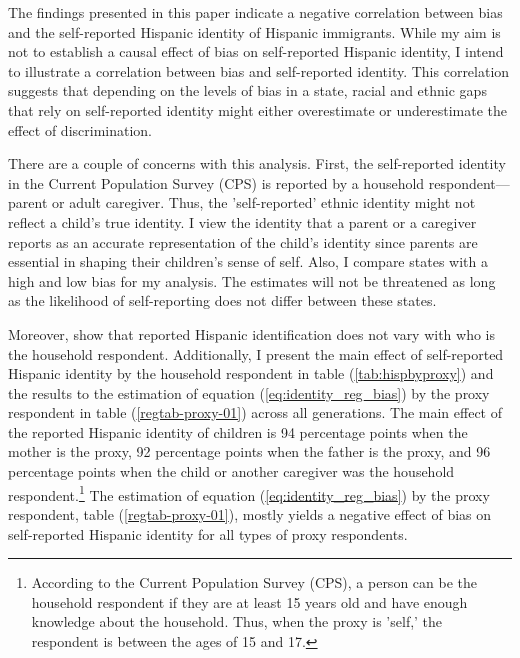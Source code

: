 \documentclass[12pt,english]{article}
\begin{document}
The findings presented in this paper indicate a negative correlation between bias and the self-reported Hispanic identity of Hispanic immigrants. While my aim is not to establish a causal effect of bias on self-reported Hispanic identity, I intend to illustrate a correlation between bias and self-reported identity. This correlation suggests that depending on the levels of bias in a state, racial and ethnic gaps that rely on self-reported identity might either overestimate or underestimate the effect of discrimination.

There are a couple of concerns with this analysis. First, the self-reported identity in the Current Population Survey (CPS) is reported by a household respondent—parent or adult caregiver. Thus, the 'self-reported' ethnic identity might not reflect a child's true identity. I view the identity that a parent or a caregiver reports as an accurate representation of the child's identity since parents are essential in shaping their children's sense of self. Also, I compare states with a high and low bias for my analysis. The estimates will not be threatened as long as the likelihood of self-reporting does not differ between these states.

Moreover, \textcite{duncanIntermarriageIntergenerationalTransmission2011} show that reported Hispanic identification does not vary with who is the household respondent. Additionally, I present the main effect of self-reported Hispanic identity by the household respondent in table (\ref{tab:hispbyproxy}) and the results to the estimation of equation (\ref{eq:identity_reg_bias}) by the proxy respondent in table (\ref{regtab-proxy-01}) across all generations. The main effect of the reported Hispanic identity of children is 94 percentage points when the mother is the proxy, 92 percentage points when the father is the proxy, and 96 percentage points when the child or another caregiver was the household respondent.\footnote{According to the Current Population Survey (CPS), a person can be the household respondent if they are at least 15 years old and have enough knowledge about the household. Thus, when the proxy is 'self,' the respondent is between the ages of 15 and 17.} The estimation of equation (\ref{eq:identity_reg_bias}) by the proxy respondent, table (\ref{regtab-proxy-01}), mostly yields a negative effect of bias on self-reported Hispanic identity for all types of proxy respondents.


\end{document}
